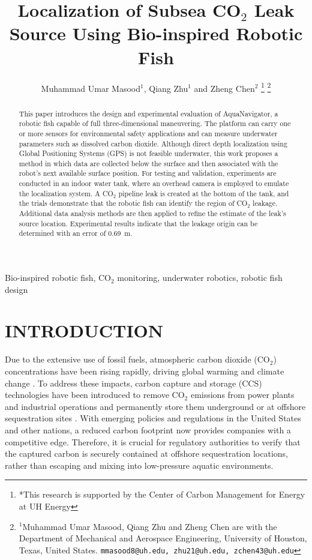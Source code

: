 \documentclass[12pt, draftclsnofoot, onecolumn]{IEEEtran}
\begin{document}
\title{Localization of Subsea CO$_2$ Leak Source Using Bio-inspired Robotic Fish}

\author{Muhammad Umar Masood$^{1}$, Qiang Zhu$^{1}$ and Zheng Chen$^{2}$%
\thanks{*This research is supported by the Center of Carbon Management for Energy at UH Energy}%
\thanks{$^{1}$Muhammad Umar Masood, Qiang Zhu and Zheng Chen are with the Department of Mechanical and Aerospace Engineering, University of Houston, Texas, United States.
{\tt\small mmasood8@uh.edu, zhu21@uh.edu, zchen43@uh.edu}}%
}
\maketitle

\begin{abstract}
This paper introduces the design and experimental evaluation of AquaNavigator, a robotic fish capable of full three-dimensional maneuvering. The platform can carry one or more sensors for environmental safety applications and can measure underwater parameters such as dissolved carbon dioxide. Although direct depth localization using Global Positioning Systems (GPS) is not feasible underwater, this work proposes a method in which data are collected below the surface and then associated with the robot’s next available surface position. For testing and validation, experiments are conducted in an indoor water tank, where an overhead camera is employed to emulate the localization system. A CO$_2$ pipeline leak is created at the bottom of the tank, and the trials demonstrate that the robotic fish can identify the region of CO$_2$ leakage. Additional data analysis methods are then applied to refine the estimate of the leak’s source location. Experimental results indicate that the leakage origin can be determined with an error of 0.69~m.
\end{abstract}
\begin{IEEEkeywords}
Bio-inspired robotic fish, CO$_2$ monitoring, underwater robotics, robotic fish design
\end{IEEEkeywords}

\section{INTRODUCTION}
Due to the extensive use of fossil fuels, atmospheric carbon dioxide (CO$_2$) concentrations have been rising rapidly, driving global warming and climate change \cite{Filonchyk2024,Kabir2023}. To address these impacts, carbon capture and storage (CCS) technologies have been introduced to remove CO$_2$ emissions from power plants and industrial operations and permanently store them underground or at offshore sequestration sites \cite{Herzog2001,Yadav2022,Osman2021}. With emerging policies and regulations in the United States and other nations, a reduced carbon footprint now provides companies with a competitive edge. Therefore, it is crucial for regulatory authorities to verify that the captured carbon is securely contained at offshore sequestration locations, rather than escaping and mixing into low-pressure aquatic environments.
\end{document}
